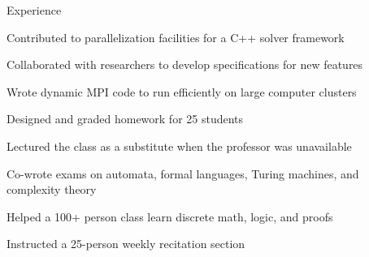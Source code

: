\documentclass{cv}
\begin{document}

\begin{cvsection}{Experience}
  {
    \item Contributed to parallelization facilities for a C++ solver framework
    \item Collaborated with researchers to develop specifications for new features
    \item Wrote dynamic MPI code to run efficiently on large computer clusters
  }
  {
    \item Designed and graded homework for 25 students
    \item Lectured the class as a substitute when the professor was unavailable
    \item Co-wrote exams on automata, formal languages, Turing machines, and complexity theory
  }
  {
    \item Helped a 100+ person class learn discrete math, logic, and proofs
    \item Instructed a 25-person weekly recitation section
  }
\end{cvsection}
\end{document}

